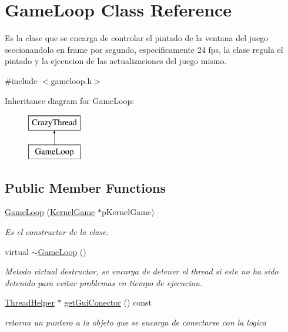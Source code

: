 \hypertarget{class_game_loop}{\section{Game\-Loop Class Reference}
\label{class_game_loop}
}


Es la clase que se encarga de controlar el pintado de la ventana del juego seccionandolo en frame por segundo, especificamente 24 fps, la clase regula el pintado y la ejecucion de las actualizaciones del juego mismo.  




{\ttfamily \#include $<$gameloop.\-h$>$}

Inheritance diagram for Game\-Loop\-:\begin{figure}[H]
\begin{center}
\leavevmode
\includegraphics[height=2.000000cm]{class_game_loop}
\end{center}
\end{figure}
\subsection*{Public Member Functions}
\begin{DoxyCompactItemize}
\item 
\hyperlink{class_game_loop_adbe6559d3c3270054090db3b98a5c2d5}{Game\-Loop} (\hyperlink{class_kernel_game}{Kernel\-Game} $\ast$p\-Kernel\-Game)
\begin{DoxyCompactList}\small\item\em Es el constructor de la clase. \end{DoxyCompactList}\item 
virtual \hyperlink{class_game_loop_ae6c558d0d751a068dbafe2cae465ec1f}{$\sim$\-Game\-Loop} ()
\begin{DoxyCompactList}\small\item\em Metodo virtual destructor, se encarga de detener el thread si este no ha sido detenido para evitar problemas en tiempo de ejecucion. \end{DoxyCompactList}\item 
\hyperlink{class_thread_helper}{Thread\-Helper} $\ast$ \hyperlink{class_game_loop_aa95091d6b9fbc580219ee08374ca1642}{get\-Gui\-Conector} () const 
\begin{DoxyCompactList}\small\item\em retorna un puntero a la objeto que se encarga de conectarse con la logica \end{DoxyCompactList}\end{DoxyCompactItemize}
